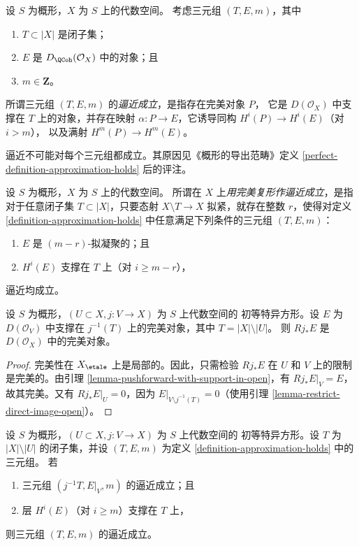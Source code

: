 \begin{definition}
\label{definition-approximation-holds}
设 $S$ 为概形，$X$ 为 $S$ 上的代数空间。
考虑三元组 $(T, E, m)$，其中
\begin{enumerate}
\item $T \subset |X|$ 是闭子集；
\item $E$ 是 $D_\QCoh(\mathcal{O}_X)$ 中的对象；且
\item $m \in \mathbf{Z}$。
\end{enumerate}
所谓三元组 $(T, E, m)$ 的{\it 逼近成立}，是指存在完美对象 $P$，
它是 $D(\mathcal{O}_X)$ 中支撑在 $T$ 上的对象，并存在映射
$\alpha : P \to E$，它诱导同构 $H^i(P) \to H^i(E)$（对 $i > m$），
以及满射 $H^m(P) \to H^m(E)$。
\end{definition}

\noindent
逼近不可能对每个三元组都成立。其原因见《概形的导出范畴》定义
\ref{perfect-definition-approximation-holds} 后的评注。

\begin{definition}
\label{definition-approximation}
设 $S$ 为概形，$X$ 为 $S$ 上的代数空间。
所谓在 $X$ 上{\it 用完美复形作逼近成立}，是指对于任意闭子集
$T \subset |X|$，只要态射
$X \setminus T \to X$ 拟紧，就存在整数 $r$，使得对定义
\ref{definition-approximation-holds} 中任意满足下列条件的三元组
$(T, E, m)$：
\begin{enumerate}
\item $E$ 是 $(m - r)$-拟凝聚的；且
\item $H^i(E)$ 支撑在 $T$ 上（对 $i \geq m - r$），
\end{enumerate}
逼近均成立。
\end{definition}

\begin{lemma}
\label{lemma-pushforward-perfect}
设 $S$ 为概形，$(U \subset X, j : V \to X)$ 为 $S$ 上代数空间的
初等特异方形。设 $E$ 为 $D(\mathcal{O}_V)$ 中支撑在
$j^{-1}(T)$ 上的完美对象，其中 $T = |X| \setminus |U|$。
则 $Rj_*E$ 是 $D(\mathcal{O}_X)$ 中的完美对象。
\end{lemma}

\begin{proof}
完美性在 $X_\etale$ 上是局部的。因此，只需检验 $Rj_*E$
在 $U$ 和 $V$ 上的限制是完美的。由引理
\ref{lemma-pushforward-with-support-in-open}，有 $Rj_*E|_V = E$，
故其完美。又有 $Rj_*E|_U = 0$，因为
$E|_{V \setminus j^{-1}(T)} = 0$（使用引理
\ref{lemma-restrict-direct-image-open}）。
\end{proof}

\begin{lemma}
\label{lemma-open}
设 $S$ 为概形，$(U \subset X, j : V \to X)$ 为 $S$ 上代数空间的
初等特异方形。设 $T$ 为 $|X| \setminus |U|$ 的闭子集，并设
$(T, E, m)$ 为定义 \ref{definition-approximation-holds} 中的三元组。
若
\begin{enumerate}
\item 三元组 $(j^{-1}T, E|_V, m)$ 的逼近成立；且
\item 层 $H^i(E)$（对 $i \geq m$）支撑在 $T$ 上，
\end{enumerate}
则三元组 $(T, E, m)$ 的逼近成立。
\end{lemma}


